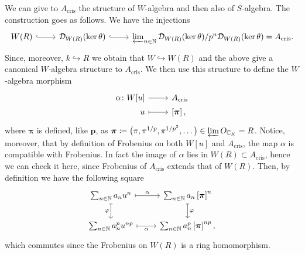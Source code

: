\begin{rem}[]\label{AcrisAlgebraStructures}
	We can give to $A_{\mathrm{cris}}$ the structure of $W$-algebra and then also
	of $S$-algebra.
	The construction goes as follows.
	We have the injections
	\begin{equation*}
	\begin{tikzcd}
		W(R) \arrow[r, "", hookrightarrow] &
		\mathcal{D}_{W(R)}(\ker\theta) \arrow[r, "", hookrightarrow] &
		\varprojlim_{n \in \mathbb{N}} \mathcal{D}_{W(R)}(\ker\theta)/
		p^n \mathcal{D}_{W(R)}(\ker\theta) = A_{\mathrm{cris}}
	.\end{tikzcd}
	\end{equation*}
	Since, moreover, $k \hookrightarrow R$ we obtain that $W \hookrightarrow W(R)$
	and the above give a canonical $W$-algebra structure to $A_{\mathrm{cris}}$.
	We then use this structure to define the $W$-algebra morphism
	\begin{equation*}
	\begin{tikzcd}[row sep = 0ex
		,/tikz/column 1/.append style={anchor=base east}
		,/tikz/column 2/.append style={anchor=base west}]
		\alpha\colon W[u] \arrow[r, "", rightarrow] &
		A_{\mathrm{cris}} \\
		u \arrow[r, "", mapsto] & \left[ \boldsymbol\pi \right]
	,\end{tikzcd}
	\end{equation*}
	where $\boldsymbol\pi$ is defined, like $\mathbf{p}$, as
	$\boldsymbol\pi \coloneqq \big( \pi, \pi^{1/p}, \pi^{1/p^2}, \ldots \big)
	\in \varprojlim O_{\mathbb{C}_K} = R$.
	Notice, moreover, that by definition of Frobenius on both $W[u]$ and
	$A_{\mathrm{cris}}$, the map $\alpha$ is compatible with Frobenius.
	In fact the image of $\alpha$ lies in $W(R) \subset A_{\mathrm{cris}}$, hence we can check it
	here, since Frobenius of $A_{\mathrm{cris}}$ extends that of $W(R)$.
	Then, by definition we have the following square
	\begin{equation*}
	\begin{tikzcd}
		\sum_{n \in \mathbb{N} }^{  } a_n u^n
		\arrow[r, "\alpha", mapsto] \arrow[d, "\varphi"', mapsto] &
		\sum_{n \in \mathbb{N} }^{  } a_n \left[ \boldsymbol\pi \right]^n
		\arrow[d, "\varphi", mapsto] \\
		\sum_{n \in \mathbb{N} }^{  } a_n^p u^{np}
		\arrow[r, "\alpha"', mapsto] &
		\sum_{n \in \mathbb{N} }^{  } a_n^p \left[ \boldsymbol\pi \right]^{np}
	,\end{tikzcd}
	\end{equation*}
	which commutes since the Frobenius on $W(R)$ is a ring homomorphism.

\end{rem}
